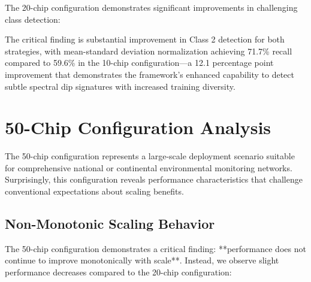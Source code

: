 The 20-chip configuration demonstrates significant improvements in challenging class detection:

\begin{table}[htbp]
\centering
\caption{Classification Performance Comparison for 20-chip Configuration}
\label{tab:performance_20chip}
\end{table}

The critical finding is substantial improvement in Class 2 detection for both strategies, with mean-standard deviation normalization achieving 71.7\% recall compared to 59.6\% in the 10-chip configuration—a 12.1 percentage point improvement that demonstrates the framework's enhanced capability to detect subtle spectral dip signatures with increased training diversity.

\section{50-Chip Configuration Analysis}
\label{sec:50chip_analysis}

The 50-chip configuration represents a large-scale deployment scenario suitable for comprehensive national or continental environmental monitoring networks. Surprisingly, this configuration reveals performance characteristics that challenge conventional expectations about scaling benefits.

\subsection{Non-Monotonic Scaling Behavior}

The 50-chip configuration demonstrates a critical finding: **performance does not continue to improve monotonically with scale**. Instead, we observe slight performance decreases compared to the 20-chip configuration:

